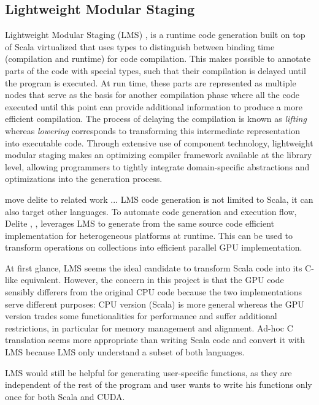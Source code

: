 \subsection{Lightweight Modular Staging} \label{intro_lms}
Lightweight Modular Staging (LMS) \cite{lms}, \cite{lms_thesis} is a runtime code generation built on top of Scala virtualized \cite{scala_virtualized} that uses types to distinguish between binding time (compilation and runtime) for code compilation. This makes possible to annotate parts of the code with special types, such that their compilation is delayed until the program is executed. At run time, these parts are represented as multiple nodes that serve as the basis for another compilation phase where all the code executed until this point can provide additional information to produce a more efficient compilation. The process of delaying the compilation is known as \textit{lifting} whereas \textit{lowering} corresponds to transforming this intermediate representation into executable code. Through extensive use of component technology, lightweight modular staging makes an optimizing compiler framework available at the library level, allowing programmers to tightly integrate domain-specific abstractions and optimizations into the generation process.

{\color{red} move delite to related work ... }
LMS code generation is not limited to Scala, it can also target other languages. To automate code generation and execution flow, Delite \cite{lms2}, \cite{lms3}, \cite{delite} leverages LMS to generate from the same source code efficient implementation for heterogeneous platforms at runtime. This can be used to transform operations on collections into efficient parallel GPU implementation.

At first glance, LMS seems the ideal candidate to transform Scala code into its C-like equivalent. However, the concern in this project is that the GPU code sensibly differers from the original CPU code because the two implementations serve different purposes: CPU version (Scala) is more general whereas the GPU version trades some functionalities for performance and suffer additional restrictions, in particular for memory management and alignment. Ad-hoc C translation seems more appropriate than writing Scala code and convert it with LMS because LMS only understand a subset of both languages.

LMS would still be helpful for generating user-specific functions, as they are independent of the rest of the program and user wants to write his functions only once for both Scala and CUDA.
